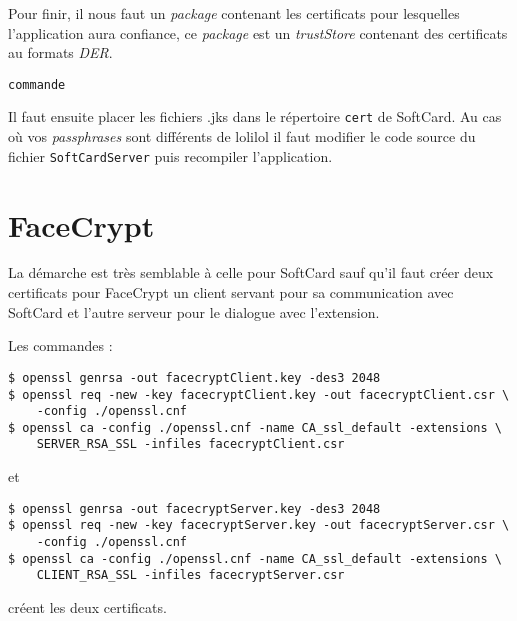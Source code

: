 \documentclass[a4paper,10pt]{article}
\begin{document}
Pour finir, il nous faut un \emph{package} contenant les certificats pour 
lesquelles l'application aura confiance, ce \emph{package} est un 
\emph{trustStore}
contenant des certificats au formats \emph{DER}.
\begin{verbatim}
commande
\end{verbatim}

Il faut ensuite placer les fichiers .jks dans le répertoire \texttt{cert}
de SoftCard. Au cas où vos \emph{passphrases} sont différents de 
\og lolilol \fg{} il faut modifier le code source du fichier 
\texttt{SoftCardServer} puis recompiler l'application.

\section{FaceCrypt}
La démarche est très semblable à celle pour SoftCard sauf qu'il faut 
créer deux certificats pour FaceCrypt un client servant pour sa communication
avec SoftCard et l'autre serveur pour le dialogue avec l'extension.

Les commandes : 
\begin{verbatim}
$ openssl genrsa -out facecryptClient.key -des3 2048
$ openssl req -new -key facecryptClient.key -out facecryptClient.csr \
    -config ./openssl.cnf
$ openssl ca -config ./openssl.cnf -name CA_ssl_default -extensions \
    SERVER_RSA_SSL -infiles facecryptClient.csr
\end{verbatim}
et 
\begin{verbatim}
$ openssl genrsa -out facecryptServer.key -des3 2048
$ openssl req -new -key facecryptServer.key -out facecryptServer.csr \
    -config ./openssl.cnf
$ openssl ca -config ./openssl.cnf -name CA_ssl_default -extensions \
    CLIENT_RSA_SSL -infiles facecryptServer.csr
\end{verbatim}
créent les deux certificats.
\end{document}
